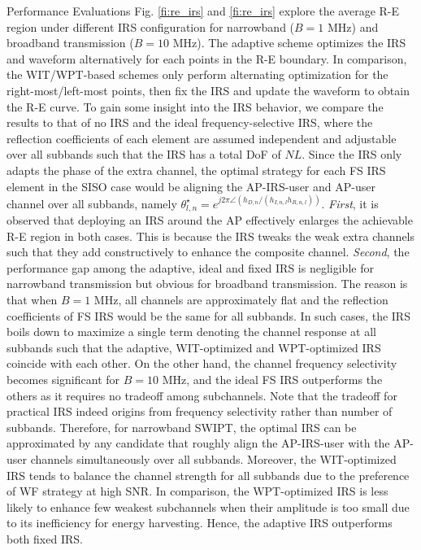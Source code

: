 \documentclass[journal]{IEEEtran}
\begin{document}
\begin{section}{Performance Evaluations}
		Fig. \ref{fi:re_irs} and \ref{fi:re_irs} explore the average R-E region under different IRS configuration for narrowband ($B=1$ \si{\MHz}) and broadband transmission ($B=10$ \si{\MHz}). The adaptive scheme optimizes the IRS and waveform alternatively for each points in the R-E boundary. In comparison, the WIT/WPT-based schemes only perform alternating optimization for the right-most/left-most points, then fix the IRS and update the waveform to obtain the R-E curve. To gain some insight into the IRS behavior, we compare the results to that of no IRS and the ideal frequency-selective IRS, where the reflection coefficients of each element are assumed independent and adjustable over all subbands such that the IRS has a total DoF of $NL$. Since the IRS only adapts the phase of the extra channel, the optimal strategy for each FS IRS element in the SISO case would be aligning the AP-IRS-user and AP-user channel over all subbands, namely $\theta_{l,n}^{\star}=e^{j2\pi\angle{(h_{D,n}/(h_{I,n,l}h_{R,n,l}))}}$. \textit{First}, it is observed that deploying an IRS around the AP effectively enlarges the achievable R-E region in both cases. This is because the IRS tweaks the weak extra channels such that they add constructively to enhance the composite channel. \textit{Second}, the performance gap among the adaptive, ideal and fixed IRS is negligible for narrowband transmission but obvious for broadband transmission. The reason is that when $B=1$ \si{\MHz}, all channels are approximately flat and the reflection coefficients of FS IRS would be the same for all subbands. In such cases, the IRS boils down to maximize a single term denoting the channel response at all subbands such that the adaptive, WIT-optimized and WPT-optimized IRS coincide with each other. On the other hand, the channel frequency selectivity becomes significant for $B=10$ \si{\MHz}, and the ideal FS IRS outperforms the others as it requires no tradeoff among subchannels. Note that the tradeoff for practical IRS indeed origins from frequency selectivity rather than number of subbands. Therefore, for narrowband SWIPT, the optimal IRS can be approximated by any candidate that roughly align the AP-IRS-user with the AP-user channels simultaneously over all subbands. Moreover, the WIT-optimized IRS tends to balance the channel strength for all subbands due to the preference of WF strategy at high SNR. In comparison, the WPT-optimized IRS is less likely to enhance few weakest subchannels when their amplitude is too small due to its inefficiency for energy harvesting. Hence, the adaptive IRS outperforms both fixed IRS.
	\end{section}

	
	
\end{document}
